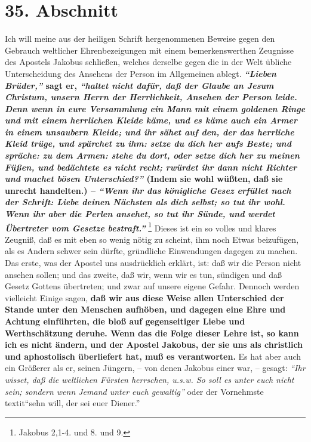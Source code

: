 \section{35. Abschnitt} \label{kap9_ab35}

Ich will meine aus der heiligen Schrift hergenommenen Beweise gegen den Gebrauch
weltlicher Ehrenbezeigungen mit einem bemerkenswerthen Zeugnisse des Apostels
Jakobus schließen, welches derselbe gegen die in der Welt übliche Unterscheidung
des Ansehens der Person im Allgemeinen ablegt.
\textbf{\textit{"`Lieben Brüder,"'} sagt er,
\textit{"`haltet nicht dafür, daß der Glaube an Jesum Christum, unsern Herrn der
Herrlichkeit, Ansehen der Person leide. Denn wenn in eure Versammlung ein Mann
mit einem goldenen Ringe und mit einem herrlichen Kleide käme, und es käme auch
ein Armer in einem unsaubern Kleide; und ihr sähet auf den, der das herrliche
Kleid trüge, und spärchet zu ihm: setze du dich her aufs Beste; und spräche: zu
dem Armen: stehe du dort, oder setze dich her zu meinen Füßen, und bedächtete es
nicht recht; rwürdet ihr dann nicht Richter und machet bösen Unterschied?"'}
(Indem sie wohl wüßten, daß sie unrecht handelten.) --\textit{ "`Wenn ihr das
königliche
Gesez erfüllet nach der Schrift: Liebe deinen Nächsten als dich selbst; so tut
ihr wohl. Wenn ihr aber die Perlen ansehet, so tut ihr Sünde, und werdet
Übertreter vom Gesetze bestraft."'}}
\footnote{Jakobus 2,1-4. und 8. und 9.}
Dieses ist
ein so volles und klares Zeugniß, daß es mit eben so wenig nötig zu scheint, ihm
noch Etwas beizufügen, als es Andern schwer sein dürfte, gründliche Einwendungen
dagegen zu machen. Das erste, was der Apostel uns ausdrücklich erklärt, ist: daß
wir die Person nicht ansehen sollen; und das zweite, daß wir, wenn wir es tun,
sündigen und daß Gesetz Gottens übertreten; und zwar auf unsere eigene Gefahr.
Dennoch werden vielleicht Einige sagen, \label{ref:09_35_staende_abschaffen}
\textbf{daß wir aus diese Weise allen
Unterschied der Stande unter den Menschen aufhöben, und dagegen eine Ehre und
Achtung einführten, die bloß auf gegenseitiger Liebe und Werthschätzung deruhe.
Wenn das die Folge dieser Lehre ist, so kann ich es nicht ändern, und der
Apostel Jakobus, der sie uns als christlich und aphostolisch überliefert hat,
muß es verantworten.} Es hat aber auch ein Größerer als er, seinen Jüngern, --
von denen Jakobus einer war, -- gesagt:
\textit{"`Ihr wisset, daß die weltlichen Fürsten
herrschen, u.s.w. So soll es unter euch nicht sein; sondern wenn Jemand unter
euch gewaltig"'} oder der Vornehmste\\textit{"`sehn will, der sei euer
Diener."'}
